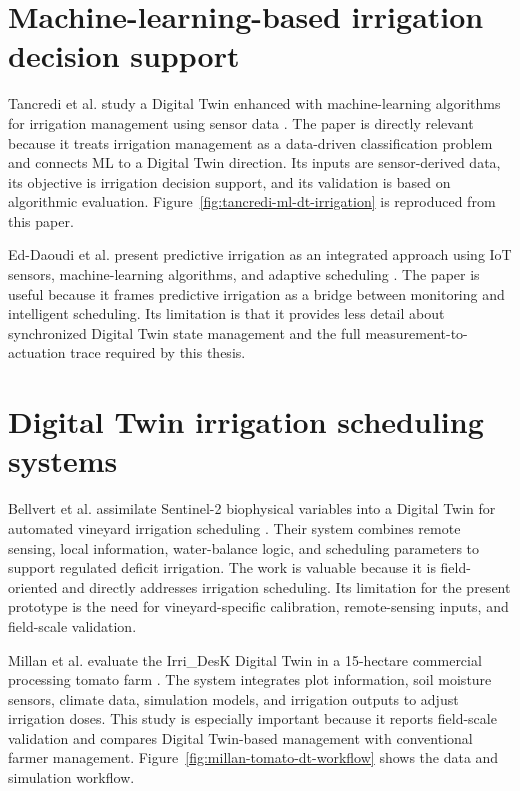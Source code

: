 \section{Machine-learning-based irrigation decision support}

Tancredi et al. study a Digital Twin enhanced with machine-learning algorithms for irrigation management using sensor data \cite{tancredi2025irrigationdt}. The paper is directly relevant because it treats irrigation management as a data-driven classification problem and connects ML to a Digital Twin direction. Its inputs are sensor-derived data, its objective is irrigation decision support, and its validation is based on algorithmic evaluation. Figure~\ref{fig:tancredi-ml-dt-irrigation} is reproduced from this paper.

Ed-Daoudi et al. present predictive irrigation as an integrated approach using IoT sensors, machine-learning algorithms, and adaptive scheduling \cite{eddaoudi2024predictiveirrigation}. The paper is useful because it frames predictive irrigation as a bridge between monitoring and intelligent scheduling. Its limitation is that it provides less detail about synchronized Digital Twin state management and the full measurement-to-actuation trace required by this thesis.

\section{Digital Twin irrigation scheduling systems}

Bellvert et al. assimilate Sentinel-2 biophysical variables into a Digital Twin for automated vineyard irrigation scheduling \cite{bellvert2023vineyarddt}. Their system combines remote sensing, local information, water-balance logic, and scheduling parameters to support regulated deficit irrigation. The work is valuable because it is field-oriented and directly addresses irrigation scheduling. Its limitation for the present prototype is the need for vineyard-specific calibration, remote-sensing inputs, and field-scale validation.

Millan et al. evaluate the Irri\_DesK Digital Twin in a 15-hectare commercial processing tomato farm \cite{millan2025tomatodt}. The system integrates plot information, soil moisture sensors, climate data, simulation models, and irrigation outputs to adjust irrigation doses. This study is especially important because it reports field-scale validation and compares Digital Twin-based management with conventional farmer management. Figure~\ref{fig:millan-tomato-dt-workflow} shows the data and simulation workflow.

